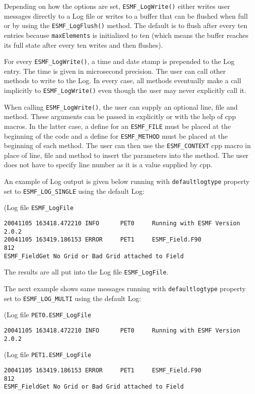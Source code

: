 Depending on how the options are set, {\tt ESMF\_LogWrite()} either writes user
messages directly to a Log file or writes to a buffer that can be flushed when 
full or by using the {\tt ESMF\_LogFlush()} method.  The default is to flush 
after every ten entries because {\tt maxElements} is initialized to ten 
(which means the buffer reaches its full state after every ten writes and then
flushes).

For every {\tt ESMF\_LogWrite()}, a time and date stamp is prepended to the
Log entry.  The time is given in microsecond precision.  The user can call 
other methods to write to the Log.  In every case, all methods eventually make 
a call implicitly to {\tt ESMF\_LogWrite()} even though the user may never 
explicitly call it.

When calling {\tt ESMF\_LogWrite()}, the user can supply an optional line,
file and method.  These arguments can be passed in explicitly or with the help
of cpp macros.  In the latter case, a define for an {\tt ESMF\_FILE} must be 
placed at the beginning of the code and a define for {\tt ESMF\_METHOD} must
be placed at the beginning of each method.  The user can then use the
{\tt ESMF\_CONTEXT} cpp macro in place of line, file and method to insert the 
parameters into the method.  The user does not have to specify line number as
it is a value supplied by cpp.

An example of Log output is given below running with {\tt defaultlogtype} 
property set to {\tt ESMF\_LOG\_SINGLE} using the default Log:

(Log file {\tt ESMF\_LogFile}
\begin{verbatim}
20041105 163418.472210 INFO      PET0     Running with ESMF Version 2.0.2   
20041105 163419.186153 ERROR     PET1     ESMF_Field.F90             812  
ESMF_FieldGet No Grid or Bad Grid attached to Field
\end{verbatim}

The results are all put into the Log file {\tt ESMF\_LogFile}.

The next example shows same messages running with {\tt defaultlogtype} 
property set to {\tt ESMF\_LOG\_MULTI} using the default Log:

(Log file {\tt PET0.ESMF\_LogFile}
\begin{verbatim}
20041105 163418.472210 INFO      PET0     Running with ESMF Version 2.0.2   
\end{verbatim}

(Log file {\tt PET1.ESMF\_LogFile}
\begin{verbatim}
20041105 163419.186153 ERROR     PET1     ESMF_Field.F90             812  
ESMF_FieldGet No Grid or Bad Grid attached to Field
\end{verbatim}

